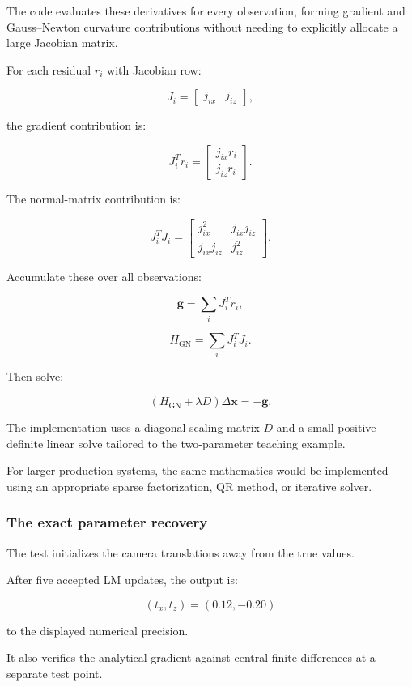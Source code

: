 The code evaluates these derivatives for every observation, forming gradient and Gauss--Newton curvature contributions without needing to explicitly allocate a large Jacobian matrix.

For each residual \(r_i\) with Jacobian row:

\[
J_i= \begin{bmatrix} j_{ix}&j_{iz} \end{bmatrix},
\]

the gradient contribution is:

\[
J_i^Tr_i= \begin{bmatrix} j_{ix}r_i\\ j_{iz}r_i \end{bmatrix}.
\]

The normal-matrix contribution is:

\[
J_i^TJ_i= \begin{bmatrix} j_{ix}^2&j_{ix}j_{iz}\\ j_{ix}j_{iz}&j_{iz}^2 \end{bmatrix}.
\]

Accumulate these over all observations:

\[
\mathbf g=\sum_iJ_i^Tr_i,
\]

\[
H_{\mathrm{GN}}=\sum_iJ_i^TJ_i.
\]

Then solve:

\[
(H_{\mathrm{GN}}+\lambda D)\Delta\mathbf x=-\mathbf g.
\]

The implementation uses a diagonal scaling matrix \(D\) and a small positive-definite linear solve tailored to the two-parameter teaching example.

For larger production systems, the same mathematics would be implemented using an appropriate sparse factorization, QR method, or iterative solver.

\subsubsection{The exact parameter recovery}\label{02-foundations-ii-ch028-the-exact-parameter-recovery}

The test initializes the camera translations away from the true values.

After five accepted LM updates, the output is:

\[
\boxed{ (t_x,t_z)=(0.12,-0.20) }
\]

to the displayed numerical precision.

It also verifies the analytical gradient against central finite differences at a separate test point.

